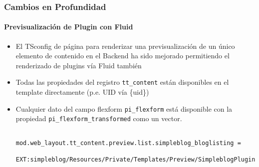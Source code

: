 \begin{frame}[fragile]
	\frametitle{Cambios en Profundidad}
	\framesubtitle{Previsualización de Plugin con Fluid}

	\lstset{basicstyle=\tiny\ttfamily}

	\begin{itemize}
		\item El TSconfig de página para renderizar una previsualización de un único elemento de contenido en el Backend ha sido mejorado
			permitiendo el renderizado de plugins vía Fluid también

		\item Todas las propiedades del registro \texttt{tt\_content} están disponibles en el template directamente (p.e. UID vía \{uid\})

		\item Cualquier dato del campo flexform \texttt{pi\_flexform} está disponible con la propiedad
			\texttt{pi\_flexform\_transformed} como un vector.

			\begin{lstlisting}
				mod.web_layout.tt_content.preview.list.simpleblog_bloglisting =
				  EXT:simpleblog/Resources/Private/Templates/Preview/SimpleblogPlugin.html
			\end{lstlisting}

	\end{itemize}

\end{frame}


